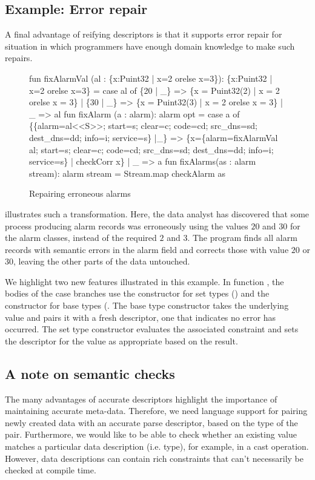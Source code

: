 \subsection{Example: Error repair}
A final advantage of reifying descriptors is that it supports error repair for situation in which programmers have enough domain knowledge to make such repairs.
\begin{figure}
  \centering
\begin{code}
fun fixAlarmVal (al : \{x:Puint32 | x=2 orelse x=3\}): 
  \{x:Puint32 | x=2 orelse x=3\} =
    case al of
      \{20 | _\} => \{x = Puint32(2) | x = 2 orelse x = 3\}
    | \{30 | _\} => \{x = Puint32(3) | x = 2 orelse x = 3\}
    | _ => al
\mbox{}
fun fixAlarm (a : alarm): alarm opt =
    case a of 
	\{\{alarm=al<<S>>; start=s; clear=c; 
          code=cd; src_dns=sd; dest_dns=dd; 
	  info=i; service=s\} |_\} 
          => \{x=\{alarm=fixAlarmVal al; 
                 start=s; clear=c; 
                 code=cd; src_dns=sd; dest_dns=dd; 
                 info=i; service=s\}
              | checkCorr x\} 
      | _ => a
\mbox{}
fun fixAlarms(as : alarm stream): alarm stream =
    Stream.map checkAlarm as
\end{code}
  \caption{Repairing erroneous alarms}
  \label{fig:ex-error-repair}
\end{figure}


 illustrates such a transformation.
Here, the data analyst
has discovered that some process producing alarm records was
erroneously using the values $20$ and $30$ for the alarm classes,
instead of the required $2$ and $3$. The program finds all alarm
records with semantic errors in the alarm field and corrects those
with value $20$ or $30$, leaving the other parts of the data untouched. 

We highlight two new \datatype{} features illustrated in this example. In function , the bodies of the case
branches use the constructor for set types () and the
constructor for base types (.  The base type constructor takes the underlying value and pairs it with a fresh descriptor, one that indicates no error has occurred.  The set type constructor evaluates the associated constraint and sets the descriptor for the value as appropriate based on the result.


\subsection{A note on semantic checks}
The many advantages of accurate descriptors highlight the
importance of maintaining accurate meta-data. Therefore, we need
language support for pairing newly created data with an accurate parse
descriptor, based on the type of the pair. Furthermore, we would like
to be able to check whether an existing value matches a particular
data description (i.e. type), for example, in a cast operation.
However, data descriptions can contain rich constraints that can't
necessarily be checked at compile time.

